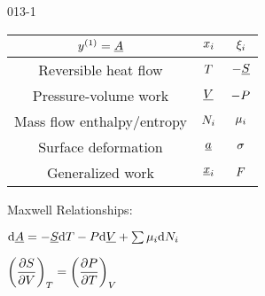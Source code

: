 \begin{mitframe}{013-1}

    

\begin{longtable}{ | c | c | c | } 
 \hline
 	$ y^{(1)}= \uline{\helmholtz}$& $\conjcoor$ & $\conjcoortwo_{\state}$ \\ \hline
	Reversible heat flow & $\Temp$ & $-\uline{\entropy}$ \\ \hline 
	Pressure-volume work & $\uline{\vol}$ & $-\p$  \\ \hline
 	Mass flow enthalpy/entropy& $\nummoles_{\state}$ & $\chempot_{\state}$ \\ \hline   
	Surface deformation & $\totalsa$ & $\surftens$ \\ \hline   
    Generalized work & $\gendisp_{\state}$ & $\force$ \\ \hline
 
 
\end{longtable}

    
    
\begin{listone}
        
    \item Maxwell Relationships:
        
    \item $\mathrm{d}\uline{\helmholtz} = -\uline{\entropy}\mathrm{d}\Temp - \p\mathrm{d}\uline{\vol} + \sum\nolimits\chempot_{\state}\mathrm{d}\nummoles_{\state}$
         
    \item $\bigg(\dfrac{\partial\entropy}{\partial\vol}\bigg)_{\Temp} = \bigg(\dfrac{\partial\p}{\partial\Temp}\bigg)_{\vol}$
    
\end{listone}			

\end{mitframe}